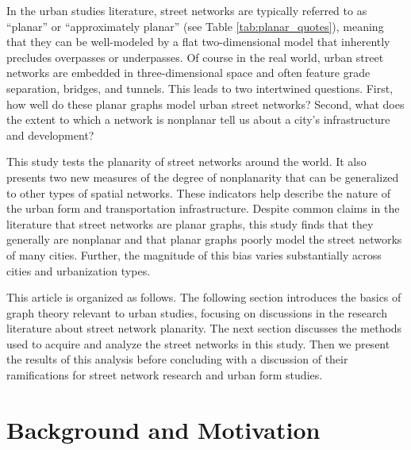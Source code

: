 \documentclass[Afour,sageh,times]{sagej}
\begin{document}
In the urban studies literature, street networks are typically referred to as \enquote{planar} or \enquote{approximately planar} (see Table \ref{tab:planar_quotes}), meaning that they can be well-modeled by a flat two-dimensional model that inherently precludes overpasses or underpasses. Of course in the real world, urban street networks are embedded in three-dimensional space and often feature grade separation, bridges, and tunnels. This leads to two intertwined questions. First, how well do these planar graphs model urban street networks? Second, what does the extent to which a network is nonplanar tell us about a city's infrastructure and development?

This study tests the planarity of street networks around the world. It also presents two new measures of the degree of nonplanarity that can be generalized to other types of spatial networks. These indicators help describe the nature of the urban form and transportation infrastructure. Despite common claims in the literature that street networks are planar graphs, this study finds that they generally are nonplanar and that planar graphs poorly model the street networks of many cities. Further, the magnitude of this bias varies substantially across cities and urbanization types.

This article is organized as follows. The following section introduces the basics of graph theory relevant to urban studies, focusing on discussions in the research literature about street network planarity. The next section discusses the methods used to acquire and analyze the street networks in this study. Then we present the results of this analysis before concluding with a discussion of their ramifications for street network research and urban form studies.


\section{Background and Motivation}
\end{document}
